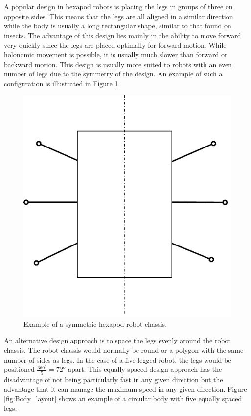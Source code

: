 A popular design in hexapod robots is placing the legs in groups of three on opposite sides. This means that the legs are all aligned in a similar direction while the body is usually a long rectangular shape, similar to that found on insects. The advantage of this design lies mainly in the ability to move forward very quickly since the legs are placed optimally for forward motion. While holonomic movement is possible, it is usually much slower than forward or backward motion. This design is usually more suited to robots with an even number of legs due to the symmetry of the design. An example of such a configuration is illustrated in Figure \ref{fig:Body_layout_hex}.
\FloatBarrier
\begin{figure}[h]
\centering
\includegraphics[scale = 1]{pics/Body_layout_hex.pdf}
\caption{Example of a symmetric hexapod robot chassis.}
\label{fig:Body_layout_hex}
\end{figure}
\FloatBarrier

An alternative design approach is to space the legs evenly around the robot chassis. The robot chassis would normally be round or a polygon with the same number of sides as legs. In the case of a five legged robot, the legs would be positioned $\frac{360^o}{5} = 72^o $ apart.
This equally spaced design approach has the disadvantage of not being particularly fast in any given direction but the advantage that it can manage the maximum speed in any given direction. Figure \ref{fig:Body_layout} shows an example of a circular body with five equally spaced legs. 

